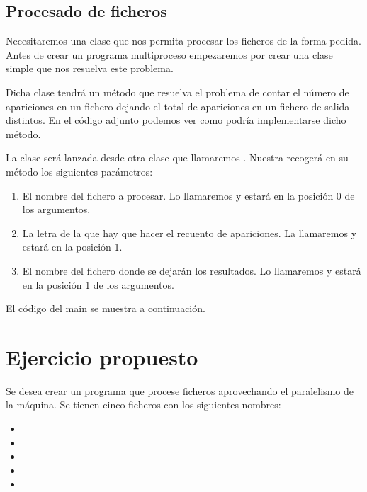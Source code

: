 \documentclass[a4paper,12pt,spanish]{sphinxmanual}
\begin{document}
\subsection{Procesado de ficheros}
\label{textos/tema1:procesado-de-ficheros}
Necesitaremos una clase  que nos permita procesar los ficheros de la forma pedida. Antes de crear un programa multiproceso empezaremos por crear una clase simple que nos resuelva este problema.

Dicha clase tendrá un método  que resuelva el problema de contar el número de apariciones en un fichero dejando el total de apariciones en un fichero de salida distintos. En el código adjunto podemos ver como podría implementarse dicho método.

La clase  será lanzada desde otra clase que llamaremos . Nuestra  recogerá en su método  los siguientes parámetros:
\begin{enumerate}
\item {} 
El nombre del fichero a procesar. Lo llamaremos  y estará en la posición 0 de los argumentos.

\item {} 
La letra de la que hay que hacer el recuento de apariciones. La llamaremos  y estará en la posición 1.

\item {} 
El nombre del fichero donde se dejarán los resultados. Lo llamaremos  y estará en la posición 1 de los argumentos.

\end{enumerate}

El código del main se muestra a continuación.


\section{Ejercicio propuesto}
\label{textos/tema1:ejercicio-propuesto}
Se desea crear un programa que procese ficheros aprovechando el paralelismo de la máquina. Se tienen cinco ficheros con los siguientes nombres:
\begin{itemize}
\item {} 

\item {} 

\item {} 

\item {} 

\item {} 

\end{itemize}
\end{document}
